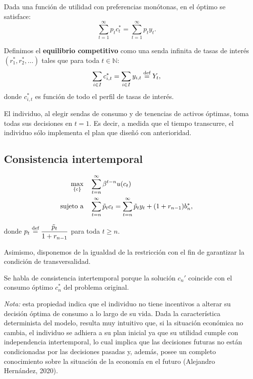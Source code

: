 \documentclass[8pt,a4paper]{extarticle}
\begin{document}
\begin{multicols}{3}
	\begin{boxprop}
		Dada una función de utilidad con preferencias monótonas, en el óptimo se satisface:
		\[\sum_{t = 1}^{\infty} p_t c^*_t = \sum_{t = 1}^{\infty} p_t y_t.\]
	\end{boxprop}

	\begin{boxdef}
		Definimos el \textbf{equilibrio competitivo} como una senda infinita de tasas de interés $(r^*_1, r^*_2, \dots)$ tales que para toda $t \in \mathbb{N}$:
		\[\sum_{i \in I} c^*_{i,t} = \sum_{i \in I} y_{i,t} \stackrel{\text{\normalfont def}}{=} Y_t,\]
		donde $c^*_{i,t}$ es función de todo el perfil de tasas de interés.
	\end{boxdef}

	\begin{boxrmk}
		El individuo, al elegir sendas de consumo y de tenencias de activos óptimas, toma todas sus decisiones en $t=1$. Es decir, a medida que el tiempo transcurre, el individuo sólo implementa el plan que diseñó con anterioridad.
	\end{boxrmk}

	\sectionbreak

	\subsection{Consistencia intertemporal}

	\begin{align*}
		\max_{\left\{ \mathrm{c} \right\}} \quad & \sum_{t = n}^{\infty} \beta^{t-n} u(c_t)                                                             \\
		\textnormal{sujeto a} \quad              & \sum_{t = n}^{\infty} \tilde{p}_t c_t = \sum_{t = n}^{\infty} \tilde{p}_t y_t + (1 + r_{n-1}) b^*_n,
	\end{align*}

	donde $\displaystyle p_t \stackrel{\text{\normalfont def}}{=} \frac{\tilde{p}_t}{1 + r_{n-1}}$ para toda $t \geq n$.

	Asimismo, disponemos de la igualdad de la restricción con el fin de garantizar la condición de transversalidad.

	\begin{boxrmk}
		Se habla de consistencia intertemporal porque la solución $c_n '$ coincide con el consumo óptimo $c_n^*$ del problema original.
	\end{boxrmk}

	\emph{Nota:} esta propiedad indica que el individuo no tiene incentivos a alterar su decisión óptima de consumo a lo largo de su vida. Dada la característica determinista del modelo, resulta muy intuitivo que, si la situación económica no cambia, el individuo se adhiera a su plan inicial ya que su utilidad cumple con independencia intertemporal, lo cual implica que las decisiones futuras no están condicionadas por las decisiones pasadas y, además, posee un completo conocimiento sobre la situación de la economía en el futuro (Alejandro Hernández, 2020).


\end{multicols}
\end{document}
